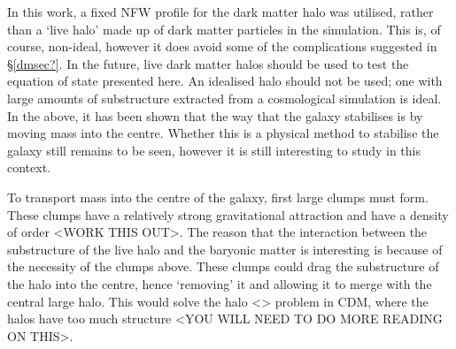 In this work, a fixed NFW profile for the dark matter halo was utilised, rather than a `live halo' made up of dark matter particles in the simulation.
This is, of course, non-ideal, however it does avoid some of the complications suggested in \S \ref{dmsec?}.
In the future, live dark matter halos should be used to test the equation of state presented here.
An idealised halo should not be used; one with large amounts of substructure extracted from a cosmological simulation is ideal.
In the above, it has been shown that the way that the galaxy stabilises is by moving mass into the centre.
Whether this is a physical method to stabilise the galaxy still remains to be seen, however it is still interesting to study in this context.

To transport mass into the centre of the galaxy, first large clumps must form.
These clumps have a relatively strong gravitational attraction and have a density of order <WORK THIS OUT>.
The reason that the interaction between the substructure of the live halo and the baryonic matter is interesting is because of the necessity of the clumps above.
These clumps could drag the substructure of the halo into the centre, hence `removing' it and allowing it to merge with the central large halo.
This would solve the halo <> problem in CDM, where the halos have too much structure <YOU WILL NEED TO DO MORE READING ON THIS>.
